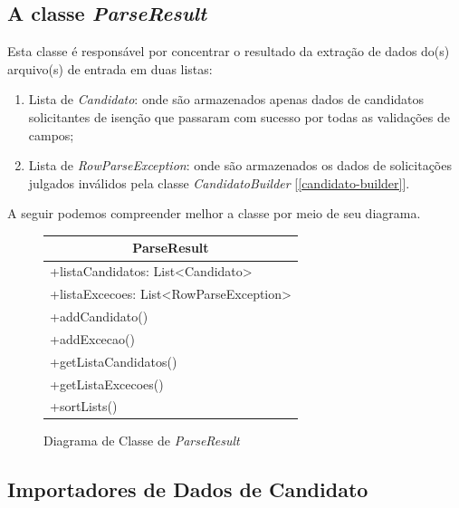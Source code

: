 \documentclass[
	12pt,			%
	openright,		%
	oneside,	
	a4paper,		%
	english,		%
	brazil			%
]{abntex2/abntex2}  %
\begin{document}
			\subsection{A classe \textit{ParseResult}} \label{cap-parse-result}
	
				Esta classe é responsável por concentrar o resultado da extração de dados do(s) arquivo(s) de entrada em duas listas:
		
				\begin{enumerate}
						
					\item Lista de \textit{Candidato}: onde são armazenados apenas dados de candidatos solicitantes de isenção que passaram com sucesso por todas as validações de campos;
					\item Lista de \textit{RowParseException}: onde são armazenados os dados de solicitações julgados inválidos pela classe \textit{CandidatoBuilder} [\ref{candidato-builder}].
						
				\end{enumerate}
	
				A seguir podemos compreender melhor a classe por meio de seu diagrama.
	
				\begin{figure}[ht]
					\begin{center}
						
						\caption{Diagrama de Classe de \textit{ParseResult}}
						\label{parseresult-uml}
						
						\begin{tabular}{|l|}
							\hline
							\multicolumn{1}{|c|}{\textbf{ParseResult}} \\ \hline
							+listaCandidatos: List\textless{}Candidato\textgreater{} \\
							+listaExcecoes: List\textless{}RowParseException\textgreater{} \\ \hline
							+addCandidato() \\
							+addExcecao() \\
							+getListaCandidatos() \\
							+getListaExcecoes() \\
							+sortLists() \\ \hline
						\end{tabular}
						
					\end{center}
				\end{figure}
	
			\subsection{Importadores de Dados de Candidato}
	
\end{document}
